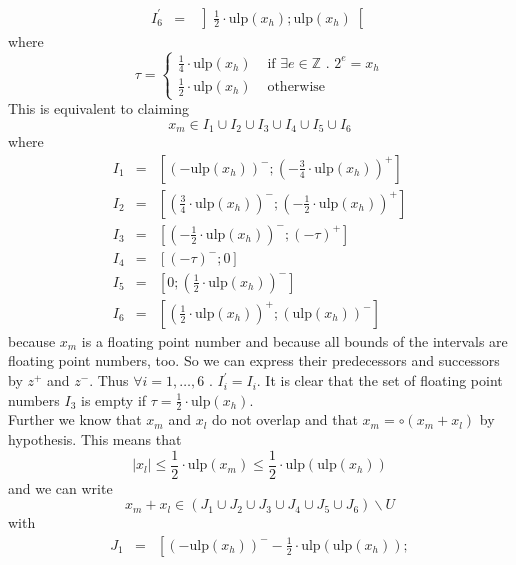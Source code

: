 \documentclass[a4paper,10pt,twoside]{article}
\newenvironment{proof}[1][Proof]{\begin{trivlist}
\item[\hskip \labelsep {\bfseries #1}]}{\end{trivlist}}
\newcommand{\Z}{\ensuremath{\mathbb {Z}}}
\newcommand{\hi}{\ensuremath{\mathit{h}}}
\newcommand{\mi}{\ensuremath{\mathit{m}}}
\newcommand{\lo}{\ensuremath{\mathit{l}}}
\newcommand{\mUlp}{\ensuremath{\mathrm{ulp}}}
\begin{document}
\begin{proof}
\begin{eqnarray*}
I^\prime_6 & = & \left ] \frac{1}{2} \cdot \mUlp\left( x_\hi \right) ; \mUlp\left( x_\hi \right) \right [
\end{eqnarray*}
where
$$\tau = \left \lbrace
\begin{array}{ll} \frac{1}{4} \cdot \mUlp \left( x_\hi \right) & \mbox{ if } \exists e \in \Z \mbox{ . } 2^e = x_\hi \\
                  \frac{1}{2} \cdot \mUlp \left( x_\hi \right) & \mbox{ otherwise} \end{array} \right.$$
This is equivalent to claiming
$$x_\mi \in I_1 \cup I_2 \cup I_3 \cup I_4 \cup I_5 \cup I_6$$
where
\begin{eqnarray*}
I_1 & = & \left [ \left( -\mUlp\left( x_\hi \right) \right)^- ;
\left( -\frac{3}{4} \cdot \mUlp\left(x_\hi \right) \right)^+ \right] \\
I_2 & = & \left [ \left( \frac{3}{4} \cdot \mUlp\left( x_\hi \right) \right)^- ;
\left(- \frac{1}{2} \cdot \mUlp\left(x_\hi \right)\right)^+ \right] \\
I_3 & = & \left [ \left( -\frac{1}{2} \cdot \mUlp\left( x_\hi \right) \right)^- ; \left( -\tau \right)^+ \right] \\
I_4 & = & \left [ \left( -\tau \right)^- ; 0 \right] \\
I_5 & = & \left [ 0 ; \left( \frac{1}{2} \cdot \mUlp\left(x_\hi\right) \right)^- \right] \\
I_6 & = & \left [ \left(\frac{1}{2} \cdot \mUlp\left( x_\hi \right) \right)^+ ; \left( \mUlp\left( x_\hi \right) \right)^- \right ]
\end{eqnarray*}
because $x_\mi$ is a floating point number and because all bounds of the intervals are floating point numbers, too. So
we can express their predecessors and successors by $z^+$ and $z^-$. Thus $\forall i=1,\dots,6 \mbox{ . } I^\prime_i = I_i$.
It is clear that the set of floating point numbers $I_3$ is empty if
$\tau = \frac{1}{2} \cdot \mUlp\left( x_\hi \right)$.\\
Further we know that $x_\mi$ and $x_\lo$ do not overlap and that $x_\mi = \circ \left( x_\mi + x_\lo \right)$ by hypothesis.
This means that
$$\left \vert x_\lo \right \vert \leq \frac{1}{2} \cdot \mUlp \left( x_\mi \right) \leq \frac{1}{2} \cdot \mUlp\left( \mUlp \left( x_\hi \right) \right)$$
and we can write
$$x_\mi + x_\lo \in \left( J_1 \cup J_2 \cup J_3 \cup J_4 \cup J_5 \cup J_6\right) \backslash U$$
with
\begin{eqnarray*}
J_1 & = & \left [ \left( -\mUlp\left( x_\hi \right) \right)^-
- \frac{1}{2} \cdot \mUlp\left( \mUlp \left( x_\hi \right) \right) ;

\end{eqnarray*}
\end{proof}
\end{document}
